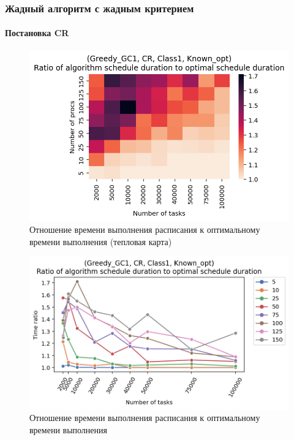\subsubsection{Жадный алгоритм с жадным критерием}

\paragraph{Постановка CR}

\begin{figure}[!htbp]
    \centering
    \includegraphics[width=\textwidth]{imgs/ideal_1/CR/th.png}
    \caption{Отношение времени выполнения расписания к оптимальному времени выполнения (тепловая карта)}
    \label{fig:CR-GC1-times-heatmap}
\end{figure}

\begin{figure}[!htbp]
    \centering
    \includegraphics[width=\textwidth]{imgs/ideal_1/CR/gr_amalgamated.png}
    \caption{Отношение времени выполнения расписания к оптимальному времени выполнения}   
    \label{fig:CR-GC1-times-compiled} 
\end{figure}


